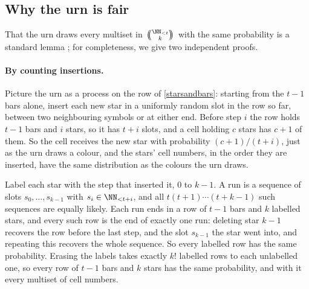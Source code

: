 \documentclass[letterpaper,11pt]{article}
\newcommand{\multichoose}[2]{
\left.\mathchoice
  {\left(\kern-0.48em\binom{#1}{#2}\kern-0.48em\right)}
  {\big(\kern-0.30em\binom{\smash{#1}}{\smash{#2}}\kern-0.30em\big)}
  {\left(\kern-0.30em\binom{\smash{#1}}{\smash{#2}}\kern-0.30em\right)}
  {\left(\kern-0.30em\binom{\smash{#1}}{\smash{#2}}\kern-0.30em\right)}
\right.}
\begin{document}
\subsection{Why the urn is fair}\label{proof}

That the urn draws every multiset in \(\multichoose{\NN_{<t}}{k}\) with
the same probability is a standard lemma \cite[Lemma 2.7]{levinperes};
for completeness, we give two independent proofs.

\paragraph{By counting insertions.} Picture the urn as a process on
the row of \autoref{starsandbars}: starting from the \(t -
1\) bars alone, insert each new star in a uniformly random slot in the
row so far, between two neighbouring symbols or at either end. Before
step \(i\) the row holds \(t - 1\) bars and \(i\) stars, so it has \(t
+ i\) slots, and a cell holding \(c\) stars has \(c + 1\) of them. So
the cell receives the new star with probability \((c + 1) / (t +
i)\), just as the urn draws a colour, and the stars' cell numbers, in
the order they are inserted, have the same distribution as the colours
the urn draws.

Label each star with the step that inserted it, \(0\) to \(k
- 1\). A run is a sequence of slots \(s_0, \ldots, s_{k-1}\) with \(s_i
\in \NN_{<t + i}\), and all \(t (t + 1) \cdots (t + k - 1)\) such
sequences are equally likely. Each run ends in a row of \(t - 1\) bars
and \(k\) labelled stars, and every such row is the end of exactly one
run: deleting star \(k - 1\) recovers the row before the last step, and
the slot \(s_{k-1}\) the star went into, and repeating this recovers
the whole sequence. So every labelled row has the same probability.
Erasing the labels takes exactly \(k!\) labelled rows to each
unlabelled one, so every row of \(t - 1\) bars and \(k\) stars has the
same probability, and with it every multiset of cell numbers.
\end{document}
